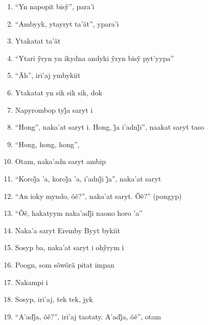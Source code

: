 \begin{enumerate}
 \item ``Yn napopit bisỹ'', para’i

 \item ``Ambyyk, ytayryt ta'ãt'', ypara'i

 \item Ytakatat ta'ãt

 \item ``Ytari ỹryn yn ikydna andyki ỹryn bisỹ pyt’yypa''

 \item ``Ãh'', iri'aj ymbykiit

 \begin{center}\end{center}

 \item Ytakatat yn sik sik sik, dok

 \item Napyrombop tyj̃a saryt i

 \item ``Hong'', naka’at saryt i. Hong, j̃a i’adnj̃i'', naakat saryt taso

 \item ``Hong, hong, hong'',

 \item Otam, naka'adn saryt ambip

 \item ``Koroj̃a ’a, koroj̃a ’a, i’adnj̃i j̃a'', naka’at saryt

 \item ``An ioky myndo, õẽ?'', naka’at saryt. Õẽ?'' (pongyp)

 \item ``Õẽ, hakatyym naka’adj̃i naono horo ’a''

 \item Naka'a saryt Eremby Byyt bykiit

 \item Sosyp ba, naka’at saryt i ohỹrym i

 \item Poogn, som sõwõrã pitat impan

 \item Nakampi i

 \begin{center}\end{center}

 \item Sosyp, iri'aj, tek tek, jyk

 \item ``A’adj̃a, õẽ?'', iri’aj taotaty. A’adj̃a, õẽ'', otam


\end{enumerate}
